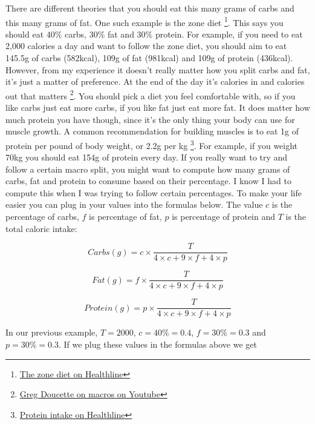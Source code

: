 \documentclass[openany, 12pt]{book}
\begin{document}
	There are different theories that you should eat this many grams of carbs and this many grams of fat. One such example is the zone diet
        \footnote{\href{https://www.healthline.com/nutrition/zone-diet}{The zone diet on Healthline}}. This says you should eat 40\% carbs, 30\% fat and 30\% protein. For example,
	if you need to eat 2,000 calories a day and want to follow the zone diet, you should aim to eat 145.5g of carbs (582kcal), 109g of fat (981kcal) and 109g of protein (436kcal).
	However, from my experience it doesn't really matter how you split carbs and fat, it's just a matter of preference. At the end of the day it's calories in and calories out that matters
        \footnote{\href{https://www.youtube.com/watch?v=ssmJ50HRTp8}{Greg Doucette on macros on Youtube}}. You should pick a diet you feel comfortable with, so if you like carbs
        just eat more carbs, if you like fat just eat more fat. It does matter how much protein you have though, since it's the only thing your body can use for muscle growth. A common
        recommendation for building muscles is to eat 1g of protein per pound of body weight, or 2.2g per kg
        \footnote{\href{https://www.healthline.com/nutrition/how-much-protein-per-day}{Protein intake on Healthline}}. For example, if you weight 70kg you should eat 154g of protein every day.
	If you really want to try and follow a certain macro split, you might want to compute how many grams of carbs, fat and protein to consume based on their percentage. I know
	I had to compute this when I was trying to follow certain percentages. To make your life easier you can plug in your values into the formulas below. The value $c$ is the 
	percentage of carbs, $f$ is percentage of fat, $p$ is percentage of protein and $T$ is the total caloric intake:
	
	\begin{equation}
		Carbs(g) = c \times \frac{T}{4 \times c + 9 \times f + 4 \times p}
	\end{equation}
	
	\begin{equation}
		Fat(g) = f \times \frac{T}{4 \times c + 9 \times f + 4 \times p}
	\end{equation}
		
	\begin{equation}
		Protein(g) = p \times \frac{T}{4 \times c + 9 \times f + 4 \times p}
	\end{equation}
	
	In our previous example, $T = 2000$, $c = 40\% = 0.4$, $f = 30\% = 0.3$ and $p = 30\% = 0.3$. If we plug these values in the formulas above we get
	
\end{document}
